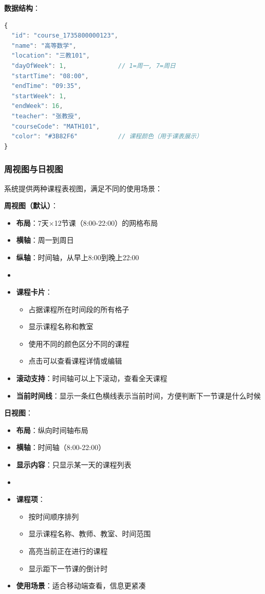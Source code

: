 \documentclass[12pt,a4paper]{article}
\begin{document}
\textbf{数据结构}：
\begin{lstlisting}[language=JavaScript]
{
  "id": "course_1735800000123",
  "name": "高等数学",
  "location": "三教101",
  "dayOfWeek": 1,              // 1=周一, 7=周日
  "startTime": "08:00",
  "endTime": "09:35",
  "startWeek": 1,
  "endWeek": 16,
  "teacher": "张教授",
  "courseCode": "MATH101",
  "color": "#3B82F6"           // 课程颜色（用于课表展示）
}
\end{lstlisting}

\subsubsection{周视图与日视图}

系统提供两种课程表视图，满足不同的使用场景：

\textbf{周视图（默认）}：
\begin{itemize}
    \item \textbf{布局}：7天×12节课（8:00-22:00）的网格布局
    \item \textbf{横轴}：周一到周日
    \item \textbf{纵轴}：时间轴，从早上8:00到晚上22:00
    \item \item \textbf{课程卡片}：
        \begin{itemize}
            \item 占据课程所在时间段的所有格子
            \item 显示课程名称和教室
            \item 使用不同的颜色区分不同的课程
            \item 点击可以查看课程详情或编辑
        \end{itemize}
    \item \textbf{滚动支持}：时间轴可以上下滚动，查看全天课程
    \item \textbf{当前时间线}：显示一条红色横线表示当前时间，方便判断下一节课是什么时候
\end{itemize}

\textbf{日视图}：
\begin{itemize}
    \item \textbf{布局}：纵向时间轴布局
    \item \textbf{横轴}：时间轴（8:00-22:00）
    \item \textbf{显示内容}：只显示某一天的课程列表
    \item \item \textbf{课程项}：
        \begin{itemize}
            \item 按时间顺序排列
            \item 显示课程名称、教师、教室、时间范围
            \item 高亮当前正在进行的课程
            \item 显示距下一节课的倒计时
        \end{itemize}
    \item \textbf{使用场景}：适合移动端查看，信息更紧凑
\end{itemize}
\end{document}

